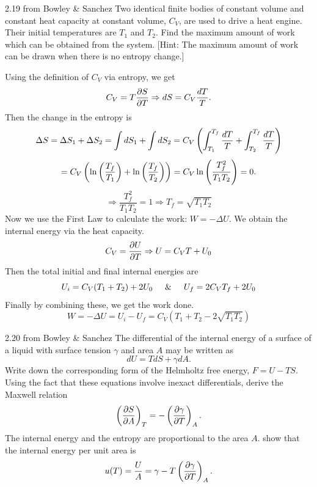     \begin{eocproblem*}{2.19 from Bowley \& Sanchez}
        Two identical finite bodies of constant volume and constant heat capacity at constant volume, $C_V$, are used to drive a heat engine. Their initial temperatures are $T_1$ and $T_2$. Find the maximum amount of work which can be obtained from the system. [Hint: The maximum amount of work can be drawn when there is no entropy change.]
    \end{eocproblem*}
        Using the definition of $C_V$ via entropy, we get
        \begin{equation}
            C_V = T\frac{\partial S}{\partial T} \Rightarrow dS = C_V\frac{dT}{T}.
        \end{equation}
        Then the change in the entropy is
        \begin{equation}
            \Delta S = \Delta S_1 + \Delta S_2 = \int dS_1 + \int dS_2 = C_V\left( \int_{T_1}^{T_f}\frac{dT}{T}+\int_{T_2}^{T_f}\frac{dT}{T} \right) \notag
        \end{equation}
        \begin{equation}
            = C_V\left( \ln\left( \frac{T_f}{T_1} \right)+\ln\left( \frac{T_f}{T_2} \right) \right) = C_V\ln\left( \frac{T_f^2}{T_1T_2} \right) = 0.
        \end{equation}
        \begin{equation}
            \Rightarrow \frac{T_f^2}{T_1T_2} = 1 \Rightarrow T_f = \sqrt{T_1T_2}
        \end{equation}
        Now we use the First Law to calculate the work: $W = -\Delta U$. We obtain the internal energy via the heat capacity.
        \begin{equation}
            C_V=\frac{\partial U}{\partial T} \Rightarrow U = C_VT + U_0 
        \end{equation}
        Then the total initial and final internal energies are
        \begin{equation}
            U_i = C_V(T_1+T_2) + 2U_0 \hspace{0.5cm} \& \hspace{0.5cm} U_f = 2C_VT_f + 2U_0
        \end{equation}
        Finally by combining these, we get the work done.
        \begin{equation}
           \boxed{ W = -\Delta U = U_i-U_f = C_V(T_1+T_2-2\sqrt{T_1T_2})}
        \end{equation}
\newpage
    \begin{eocproblem*}{2.20 from Bowley \& Sanchez}
        The differential of the internal energy of a surface of a liquid with surface tension $\gamma$ and area $A$ may be written as \[dU = TdS + \gamma dA.\] Write down the corresponding form of the Helmholtz free energy, \(F=U-TS\). Using the fact that these equations involve inexact differentials, derive the Maxwell relation \[\left( \frac{\partial S}{\partial A} \right)_T = -\left( \frac{\partial \gamma}{\partial T} \right)_A.\] The internal energy and the entropy are proportional to the area \(A\). show that the internal energy per unit area is \[u(T) = \frac{U}{A} = \gamma - T\left( \frac{\partial \gamma}{\partial T} \right)_A.\]
    \end{eocproblem*}
